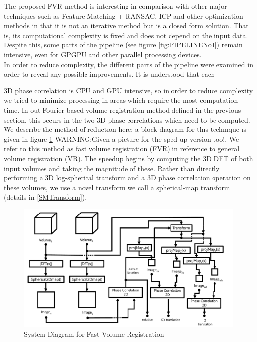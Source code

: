 
The proposed FVR method is interesting in comparison with other major techniques such as Feature Matching + RANSAC, ICP and other optimization methods in that it is not an iterative method but is a closed form solution. That is, its computational complexity is fixed and does not depend on the input data. Despite this, some parts of the pipeline (see figure \ref{fig:PIPELINENo1}) remain intensive, even for GPGPU and other parallel processing devices. \\

In order to reduce complexity, the different parts of the pipeline were examined in order to reveal any possible improvements. It is understood that each   


3D phase correlation is CPU and GPU intensive, so in order to reduce complexity we tried to minimize processing in areas which require the most computation time. In out Fourier based volume registration method defined in the previous section, this occurs in the two 3D phase correlations which need to be computed. We describe the method of reduction here; a block diagram for this technique is given in figure \ref{fig:PIPELINE3} WARNING:Given a picture for the sped up version too!. We refer to this method as fast volume registration (FVR) in reference to general volume registration (VR). The speedup begins by computing the 3D DFT of both input volumes and taking the magnitude of these. Rather than directly performing a 3D log-spherical transform and a 3D phase correlation operation on these volumes, we use a novel transform we call a spherical-map transform (details in \ref{SMTransform}).\\

\begin{figure}[!htb]
\centering
\includegraphics[width=5.0in]{images/ch2/pipeline3}
\caption{System Diagram for Fast Volume Registration}
\label{fig:PIPELINE3}
\end{figure}

